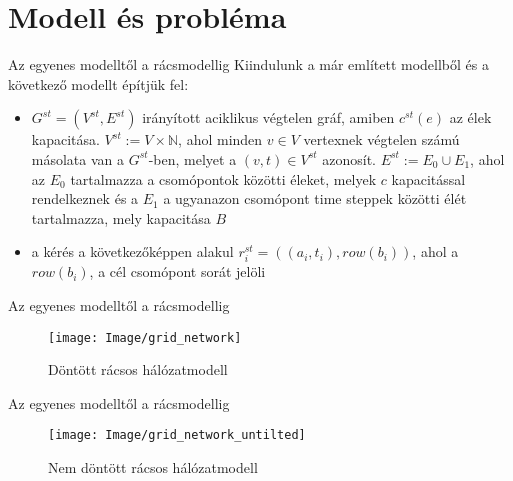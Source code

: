 \documentclass[10pt]{beamer}
\begin{document}
\section{Modell és probléma}

\begin{frame}{Az egyenes modelltől a rácsmodellig}
	Kiindulunk a már említett modellből és a következő modellt építjük fel:
	\begin{itemize}
		\item 
		$ G^{st} = \left( V^{st}, E^{st} \right) $ irányított aciklikus végtelen gráf, amiben $ c^{st}\left(e \right) $ az élek kapacitása. $ V^{st} := V \times \mathbb{N} $, ahol minden $ v \in V $ vertexnek végtelen számú másolata van a $ G^{st} $-ben, melyet a $ \left( v, t\right) \in V^{st} $ azonosít. $ E^{st} := E_0 \cup E_1 $, ahol az $ E_0 $ tartalmazza a csomópontok közötti éleket, melyek $ c $ kapacitással rendelkeznek és a $ E_1 $ a ugyanazon csomópont time steppek közötti élét tartalmazza, mely kapacitása $ B $
 		\item  a kérés a következőképpen alakul $ r_i^{st} = \left( \left( a_i, t_i\right) , row(b_i)\right) $, ahol a $ row(b_i) $, a cél csomópont sorát jelöli
	\end{itemize}
\end{frame}

\begin{frame}{Az egyenes modelltől a rácsmodellig}
	\begin{figure}
		\centering \texttt{[image: Image/grid\_network]}
		\caption{\label{fig:grid_network}Döntött rácsos hálózatmodell \cite{even2016}}
	\end{figure}
\end{frame}

\begin{frame}{Az egyenes modelltől a rácsmodellig}
	\begin{figure}
		\centering \texttt{[image: Image/grid\_network\_untilted]}
		\caption{\label{fig:grid_network_untilted}Nem döntött rácsos hálózatmodell \cite{even2016}}
	\end{figure}
\end{frame}
\end{document}
